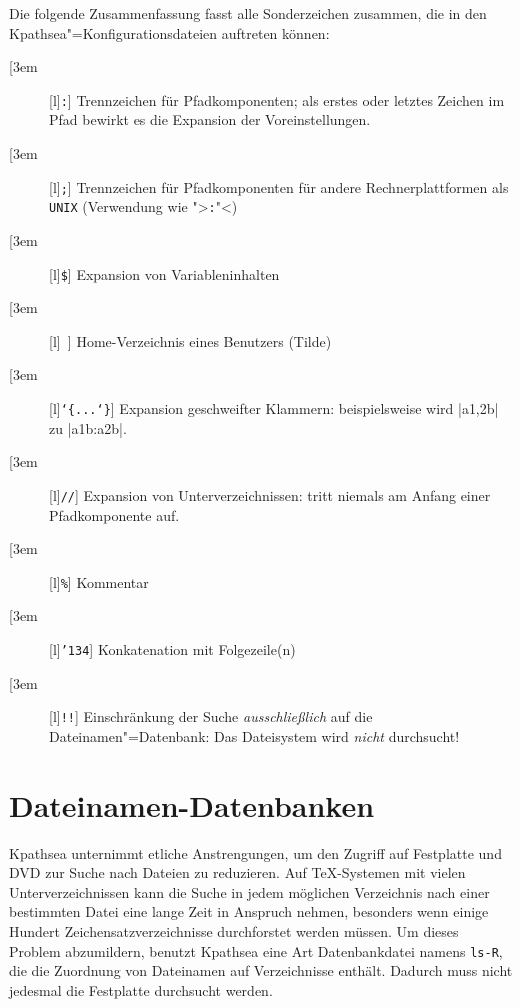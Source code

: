 \documentclass[12pt,ngerman,a4paper,fullparskip]{scrreprt}
\newcommand{\acro}[1]{\texttt{#1}}
\newcommand{\code}[1]{\texttt{#1}}
\newcommand{\file}[1]{\texttt{#1}}
\newcommand{\KPS}{Kpathsea\xspace}
\newcommand{\bs}{\protect\normalfont\ttfamily\char'134}
\begin{document}
Die folgende Zusammenfassung fasst alle Sonderzeichen zusammen, die in den
\KPS"=Konfigurationsdateien auftreten können:

\newcommand{\CODE}[1]{\makebox[3em][l]{\code{#1}}}

\begin{description}
\item[\CODE{:}]  Trennzeichen für Pfadkomponenten; als erstes
                    oder letztes Zeichen im Pfad bewirkt es die
                    Expansion der Voreinstellungen.
\item[\CODE{;}]  Trennzeichen für Pfadkomponenten für andere
                    Rechnerplattformen als \acro{UNIX} (Verwendung wie
      ">\code{:}"<)
\item[\CODE{\$}]    Expansion von Variableninhalten
\item[\CODE{\string~}]   Home-Verzeichnis eines Benutzers (Tilde)
\item[\CODE{\char`\{...\char`\}}] Expansion geschweifter Klammern:
                    beispielsweise wird |a{1,2}b| zu |a1b:a2b|.
\item[\CODE{//}]    Expansion von Unterverzeichnissen: tritt niemals
                    am Anfang einer Pfadkomponente auf.
\item[\CODE{\%}]    Kommentar
\item[\CODE{\bs}]   Konkatenation mit Folgezeile(n)
\item[\CODE{!!}]    Einschränkung der Suche \emph{ausschließlich} auf die
                    Dateinamen"=Datenbank: Das Dateisystem wird \emph{nicht}
                    durchsucht!
\end{description}



\section{Dateinamen-Datenbanken}\label{sec:filename-database}

\KPS unternimmt etliche Anstrengungen, um den Zugriff auf Festplatte und
DVD zur Suche nach Dateien zu reduzieren. Auf \TeX-Systemen mit vielen Unterverzeichnissen kann die Suche in jedem möglichen Verzeichnis nach einer bestimmten Datei eine lange Zeit in Anspruch nehmen, besonders wenn einige Hundert Zeichensatzverzeichnisse durchforstet werden müssen. Um dieses Problem abzumildern, benutzt {\KPS} eine Art Datenbankdatei namens \file{ls-R}, die die Zuordnung von Dateinamen auf Verzeichnisse enthält. Dadurch muss nicht jedesmal die Festplatte durchsucht werden.
\end{document}
